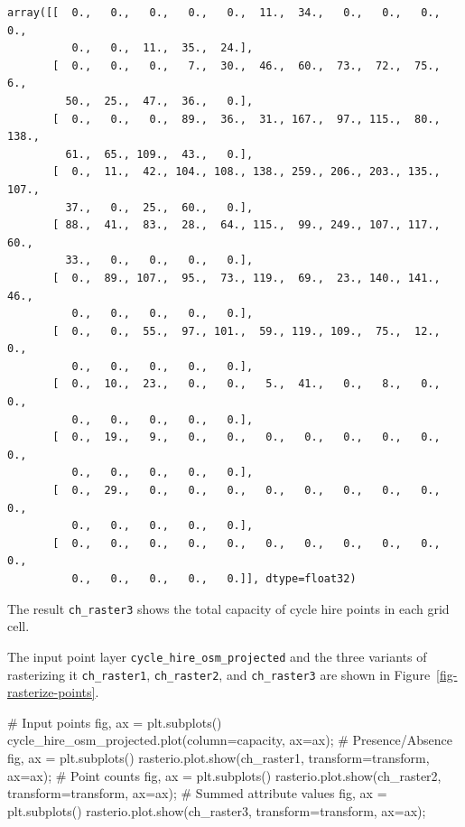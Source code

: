 \documentclass[
  letterpaper,
]{krantz}
\newenvironment{Shaded}{\begin{snugshade}}{\end{snugshade}}
\newcommand{\CommentTok}[1]{\textcolor[rgb]{0.37,0.37,0.37}{#1}}
\newcommand{\NormalTok}[1]{\textcolor[rgb]{0.00,0.23,0.31}{#1}}
\newcommand{\OperatorTok}[1]{\textcolor[rgb]{0.37,0.37,0.37}{#1}}
\newcommand{\StringTok}[1]{\textcolor[rgb]{0.13,0.47,0.30}{#1}}
\begin{document}
\begin{verbatim}
array([[  0.,   0.,   0.,   0.,   0.,  11.,  34.,   0.,   0.,   0.,   0.,
          0.,   0.,  11.,  35.,  24.],
       [  0.,   0.,   0.,   7.,  30.,  46.,  60.,  73.,  72.,  75.,   6.,
         50.,  25.,  47.,  36.,   0.],
       [  0.,   0.,   0.,  89.,  36.,  31., 167.,  97., 115.,  80., 138.,
         61.,  65., 109.,  43.,   0.],
       [  0.,  11.,  42., 104., 108., 138., 259., 206., 203., 135., 107.,
         37.,   0.,  25.,  60.,   0.],
       [ 88.,  41.,  83.,  28.,  64., 115.,  99., 249., 107., 117.,  60.,
         33.,   0.,   0.,   0.,   0.],
       [  0.,  89., 107.,  95.,  73., 119.,  69.,  23., 140., 141.,  46.,
          0.,   0.,   0.,   0.,   0.],
       [  0.,   0.,  55.,  97., 101.,  59., 119., 109.,  75.,  12.,   0.,
          0.,   0.,   0.,   0.,   0.],
       [  0.,  10.,  23.,   0.,   0.,   5.,  41.,   0.,   8.,   0.,   0.,
          0.,   0.,   0.,   0.,   0.],
       [  0.,  19.,   9.,   0.,   0.,   0.,   0.,   0.,   0.,   0.,   0.,
          0.,   0.,   0.,   0.,   0.],
       [  0.,  29.,   0.,   0.,   0.,   0.,   0.,   0.,   0.,   0.,   0.,
          0.,   0.,   0.,   0.,   0.],
       [  0.,   0.,   0.,   0.,   0.,   0.,   0.,   0.,   0.,   0.,   0.,
          0.,   0.,   0.,   0.,   0.]], dtype=float32)
\end{verbatim}

The result \texttt{ch\_raster3} shows the total capacity of cycle hire
points in each grid cell.

The input point layer \texttt{cycle\_hire\_osm\_projected} and the three
variants of rasterizing it \texttt{ch\_raster1}, \texttt{ch\_raster2},
and \texttt{ch\_raster3} are shown in Figure~\ref{fig-rasterize-points}.

\begin{Shaded}
\begin{Highlighting}[]
\CommentTok{\# Input points}
\NormalTok{fig, ax }\OperatorTok{=}\NormalTok{ plt.subplots()}
\NormalTok{cycle\_hire\_osm\_projected.plot(column}\OperatorTok{=}\StringTok{\textquotesingle{}capacity\textquotesingle{}}\NormalTok{, ax}\OperatorTok{=}\NormalTok{ax)}\OperatorTok{;}
\CommentTok{\# Presence/Absence}
\NormalTok{fig, ax }\OperatorTok{=}\NormalTok{ plt.subplots()}
\NormalTok{rasterio.plot.show(ch\_raster1, transform}\OperatorTok{=}\NormalTok{transform, ax}\OperatorTok{=}\NormalTok{ax)}\OperatorTok{;}
\CommentTok{\# Point counts}
\NormalTok{fig, ax }\OperatorTok{=}\NormalTok{ plt.subplots()}
\NormalTok{rasterio.plot.show(ch\_raster2, transform}\OperatorTok{=}\NormalTok{transform, ax}\OperatorTok{=}\NormalTok{ax)}\OperatorTok{;}
\CommentTok{\# Summed attribute values}
\NormalTok{fig, ax }\OperatorTok{=}\NormalTok{ plt.subplots()}
\NormalTok{rasterio.plot.show(ch\_raster3, transform}\OperatorTok{=}\NormalTok{transform, ax}\OperatorTok{=}\NormalTok{ax)}\OperatorTok{;}
\end{Highlighting}
\end{Shaded}
\end{document}
